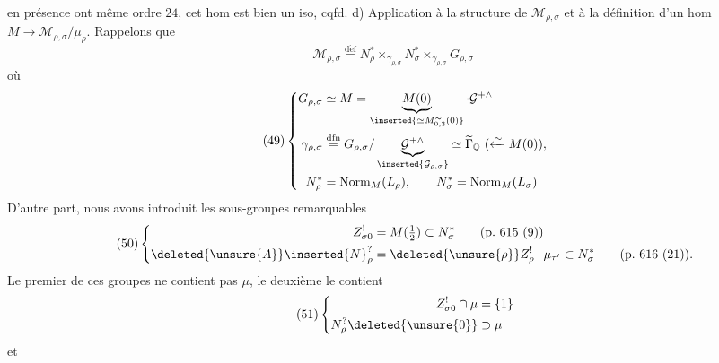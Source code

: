 en présence ont même ordre $24$, cet hom est bien un iso, cqfd.
d) Application à la structure de $\mathcal M_{\rho,\sigma}$ et à la définition d'un hom  $M\longrightarrow\mathcal M_{\rho,\sigma}/\mu_\rho$.
Rappelons que
\[
\tag{48}
\mathcal M_{\rho,\sigma}\overset{\mathrm{d\acute ef}}{=}
N_\rho^*\times_{\gamma_{\rho,\sigma}}N_\sigma^*\times_{\gamma_{\rho,\sigma}}G_{\rho,\sigma}
\]
où 
\[
\tag{49}
\left\{\begin{aligned}
G_{\rho,\sigma}&\simeq M=\underbrace{M(0)}_{\inserted{\simeq M_{0,3}^{\sim}(0)}}\cdot\mathcal G^{+\wedge}\\
\gamma_{\rho,\sigma}&\overset{\mathrm{dfn}}{=}G_{\rho,\sigma}/\underbrace{\mathcal G^{+\wedge}}_{\inserted{\mathcal G_{\rho,\sigma}}}\simeq\widetilde{\Gamma}_{\mathbb Q}\ (\xleftarrow{\sim}M(0)),\\
N_\rho^*&=\operatorname{Norm}_M(L_\rho),\qquad N_\sigma^{*}=\operatorname{Norm}_M(L_\sigma)
\end{aligned}\right.
\]
D'autre part, nous avons introduit les sous-groupes remarquables
\[
\tag{50}
\left\{\begin{aligned}
Z_{\sigma0}^!&=M(\tfrac12)\subset N_\sigma^*\qquad(\mathrm{p.}\ 615\ (9))\\
\deleted{\unsure{A}}\inserted{N}_\rho^?&=\deleted{\unsure{\rho}}Z_\rho^!\cdot\mu_{\tau'}\subset N_\sigma^*\qquad(\mathrm{p.}\ 616\ (21)).
\end{aligned}\right.
\]
Le premier de ces groupes ne contient pas $\mu$, le deuxième le contient
\[
\tag{51}
\left\{\begin{aligned}
Z_{\sigma0}^!\cap\mu&=\{1\}\\
N_\rho^?\deleted{\unsure{0}}&\supset\mu
\end{aligned}\right.
\]
et

